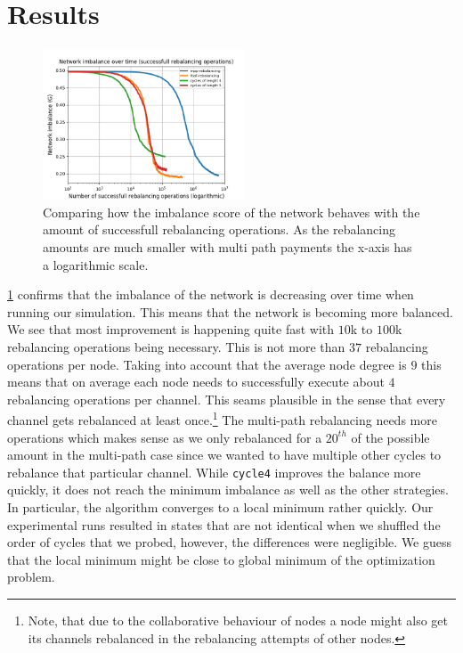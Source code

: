 \documentclass[conference]{IEEEtran}
\begin{document}
\section{Results}
\label{sec:results}

\begin{figure}
 \centering
 \includegraphics[width=6cm]{code/vs/fig/imba_vs_steps.png}
 \caption{Comparing how the imbalance score of the network behaves with the amount of successfull rebalancing operations. As the rebalancing amounts are much smaller with multi path payments the x-axis has a logarithmic scale.}
 \label{fig:imbalancehovertime}
\end{figure}

\cref{fig:imbalancehovertime} confirms that the imbalance of the network is decreasing over time when running our simulation.
This means that the network is becoming more balanced.
We see that most improvement is happening quite fast with $10$k to $100$k rebalancing operations being necessary.
This is not more than $37$ rebalancing operations per node.
Taking into account that the average node degree is $9$ this means that on average each node needs to successfully execute about $4$ rebalancing operations per channel.  
This seams plausible in the sense that every channel gets rebalanced at least once.\footnote{Note, that due to the collaborative behaviour of nodes a node might also get its channels rebalanced in the rebalancing attempts of other nodes.}
The multi-path rebalancing needs more operations which makes sense as we only rebalanced for a $20^{th}$ of the possible amount in the multi-path case since we wanted to have multiple other cycles to rebalance that particular channel.
While \texttt{cycle4} improves the balance more quickly, it does not reach the minimum imbalance as well as the other strategies.
In particular, the algorithm converges to a local minimum rather quickly.
Our experimental runs resulted in states that are not identical when we shuffled the order of cycles that we probed, however, the differences were negligible. 
We guess that the local minimum might be close to global minimum of the optimization problem.
\end{document}
